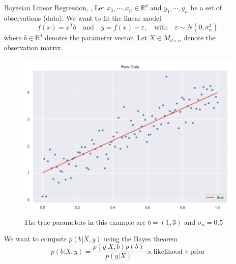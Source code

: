 \documentclass[10pt]{beamer}
\begin{document}
\begin{frame}{Bayesian Linear Regression}{\cite{reg_bayesian_regression_2019}, \cite[Chapter 2.1]{RW05}, \cite{mcelreath2020statistical}}
Let $x_1, \cdots, x_n \in \mathbb{R}^d$ and $y_1, \cdots, y_n$ be a set of observations (data). We want to fit the linear model 
$$
f(x) = x^T b \quad \text{and} \quad y = f(x) + \varepsilon, \quad \text{with} \quad \varepsilon \sim N(0, \sigma_n^2)
$$
where $b \in \mathbb{R}^d$ denotes the parameter vector. Let $X \in M_{d \times n}$ denote the observation matrix. 
\begin{center}
\begin{figure}
\includegraphics[scale=0.14]{images/lin_raw_data.png} 
\caption{The true parameters in this example are $b=(1, 3)$ and $\sigma_n=0.5$}
\end{figure}
\pause
\end{center}
We want to compute $p(b|X, y)$ using the Bayes theorem 
$$
p(b|X, y) = \frac{p(y|X, b) p(b)}{p(y|X) } \propto \text{likelihood} \times \text{prior}
$$
\end{frame}
\end{document}

